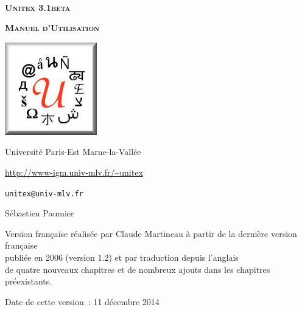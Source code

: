 
\begin{titlepage}
\begin{center}

~

\vspace{3cm}
\Huge
\textsc{\textbf{Unitex 3.1beta}}

\vspace{1cm}

\huge
\textsc{\textbf{Manuel d'Utilisation}}

\vspace{2cm}

  \begin{center}
    \includegraphics[width=4cm]{resources/img/logo-Unitex.png}
  \end{center}
\normalsize

\vspace{2cm}

\LARGE

Université Paris-Est Marne-la-Vallée
\bigskip
\normalsize

\url{http://www-igm.univ-mlv.fr/~unitex}

\verb$unitex@univ-mlv.fr$

\vspace{1cm}

Sébastien Paumier
\bigskip

Version française réalisée par Claude Martineau à partir de la dernière version française\\
publiée en 2006 (version 1.2) et par traduction depuis l'anglais\\
de quatre nouveaux chapitres et de nombreux ajouts dans les chapitres préexistants.
\bigskip

Date de cette version~: 11 décembre 2014

\end{center}

\end{titlepage}
